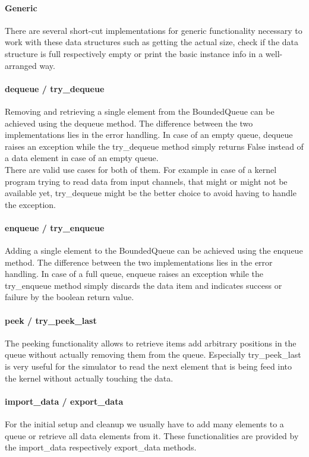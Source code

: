 \paragraph{Generic}
There are several short-cut implementations for generic functionality necessary to work with these data structures such as getting the actual size, check if the data structure is full respectively empty or print the basic instance info in a well-arranged way.


\paragraph{dequeue / try\_dequeue}
Removing and retrieving a single element from the BoundedQueue can be achieved using the dequeue method. The difference between the two implementations lies in the error handling. In case of an empty queue, dequeue raises an exception while the try\_dequeue method simply returns False instead of a data element in case of an empty queue. \\

There are valid use cases for both of them. For example in case of a kernel program trying to read data from input channels, that might or might not be available yet, try\_dequeue might be the better choice to avoid having to handle the exception.


\paragraph{enqueue / try\_enqueue}
Adding a single element to the BoundedQueue can be achieved using the enqueue method. The difference between the two implementations lies in the error handling. In case of a full queue, enqueue raises an exception while the try\_enqueue method simply discards the data item and indicates success or failure by the boolean return value. 


\paragraph{peek / try\_peek\_last}
The peeking functionality allows to retrieve items add arbitrary positions in the queue without actually removing them from the queue. Especially try\_peek\_last is very useful for the simulator to read the next element that is being feed into the kernel without actually touching the data.


\paragraph{import\_data / export\_data}
For the initial setup and cleanup we usually have to add many elements to a queue or retrieve all data elements from it. These functionalities are provided by the import\_data respectively export\_data methods.





